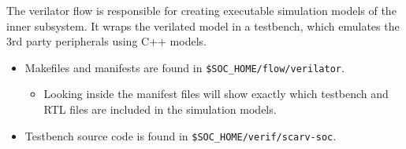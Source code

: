 
The verilator flow is responsible for creating executable simulation
models of the \SCARVSOC inner subsystem.
It wraps the verilated model in a testbench, which emulates the
3rd party peripherals using C++ models.

\begin{itemize}
\item Makefiles and manifests are found in {\tt \$SOC\_HOME/flow/verilator}.
\begin{itemize}
\item Looking inside the manifest files will show exactly which testbench
    and RTL files are included in the simulation models.
\end{itemize}
\item Testbench source code is found in {\tt \$SOC\_HOME/verif/scarv-soc}.
\end{itemize}





